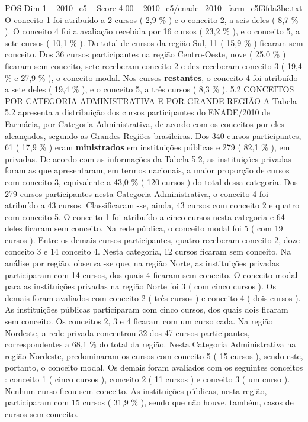 \begin{textsample}{POS Dim 1 – 2010\_c5 – Score 4.00 – 2010\_c5/enade\_2010\_farm\_c5f3fda3be.txt}
O conceito 1 foi atribuído a 2 cursos ( 2,9 \% ) e o conceito 2, a seis deles ( 8,7 \% ).
O conceito 4 foi a avaliação recebida por 16 cursos ( 23,2 \% ), e o conceito 5, a sete cursos ( 10,1 \% ).
Do total de cursos da região Sul, 11 ( 15,9 \% ) ficaram sem conceito.
Dos 36 cursos participantes na região Centro-Oeste, nove ( 25,0 \% ) ficaram sem conceito, sete receberam conceito 2 e dez receberam conceito 3 ( 19,4 \% e 27,9 \% ), o conceito modal.
Nos cursos \textbf{restantes}, o conceito 4 foi atribuído a sete deles ( 19,4 \% ), e o conceito 5, a três cursos ( 8,3 \% ). 5.2 CONCEITOS POR CATEGORIA ADMINISTRATIVA E POR GRANDE REGIÃO A Tabela 5.2 apresenta a distribuição dos cursos participantes do ENADE/2010 de Farmácia, por Categoria Administrativa, de acordo com os conceitos por eles alcançados, segundo as Grandes Regiões brasileiras.
Dos 340 cursos participantes, 61 ( 17,9 \% ) eram \textbf{ministrados} em instituições públicas e 279 ( 82,1 \% ), em privadas.
De acordo com as informações da Tabela 5.2, as instituições privadas foram as que apresentaram, em termos nacionais, a maior proporção de cursos com conceito 3, equivalente a 43,0 \% ( 120 cursos ) do total dessa categoria.
Dos 279 cursos participantes nesta Categoria Administrativa, o conceito 4 foi atribuído a 43 cursos.
Classificaram -se, ainda, 43 cursos com conceito 2 e quatro com conceito 5.
O conceito 1 foi atribuído a cinco cursos nesta categoria e 64 deles ficaram sem conceito.
Na rede pública, o conceito modal foi 5 ( com 19 cursos ).
Entre os demais cursos participantes, quatro receberam conceito 2, doze conceito 3 e 14 conceito 4.
Nesta categoria, 12 cursos ficaram sem conceito.
Na análise por região, observa -se que, na região Norte, as instituições privadas participaram com 14 cursos, dos quais 4 ficaram sem conceito.
O conceito modal para as instituições privadas na região Norte foi 3 ( com cinco cursos ).
Os demais foram avaliados com conceito 2 ( três cursos ) e conceito 4 ( dois cursos ).
As instituições públicas participaram com cinco cursos, dos quais dois ficaram sem conceito.
Os conceitos 2, 3 e 4 ficaram com um curso cada.
Na região Nordeste, a rede privada concentrou 32 dos 47 cursos participantes, correspondentes a 68,1 \% do total da região.
Nesta Categoria Administrativa na região Nordeste, predominaram os cursos com conceito 5 ( 15 cursos ), sendo este, portanto, o conceito modal.
Os demais foram avaliados com os seguintes conceitos : conceito 1 ( cinco cursos ), conceito 2 ( 11 cursos ) e conceito 3 ( um curso ).
Nenhum curso ficou sem conceito.
As instituições públicas, nesta região, participaram com 15 cursos ( 31,9 \% ), sendo que não houve, também, casos de cursos sem conceito.

\end{textsample}
